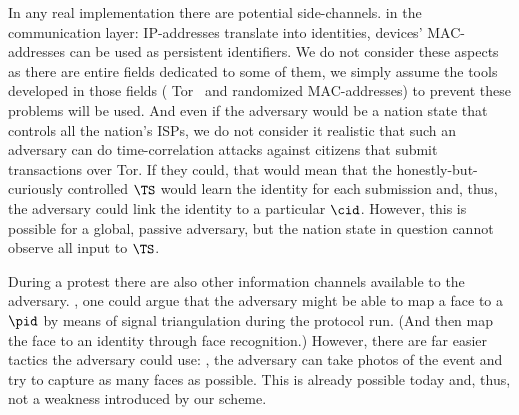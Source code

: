 In any real implementation there are potential side-channels.
\Eg in the communication layer: IP-addresses translate into identities, 
devices' MAC-addresses can be used as persistent identifiers.
We do not consider these aspects as there are entire fields dedicated to some 
of them, we simply assume the tools developed in those fields (\eg 
Tor~\cite{Tor} and randomized MAC-addresses) to prevent these problems will be 
used.
And even if the adversary would be a nation state that controls all the 
nation's \acp{ISP}, we do not consider it realistic that such an adversary can 
do \eg time-correlation attacks against citizens that submit transactions over 
Tor.
If they could, that would mean that the honestly-but-curiously controlled 
\(\TS\) would learn the identity for each submission and, thus, the adversary 
could link the identity to a particular \(\cid\).
However, this is possible for a global, passive adversary, but the nation state 
in question cannot observe all input to \(\TS\).

During a protest there are also other information channels available to the 
adversary.
\Eg, one could argue that the adversary might be able to map a face to a 
\(\pid\) by means of signal triangulation during the protocol run.
(And then map the face to an identity through face recognition.)
However, there are far easier tactics the adversary could use: \eg, the 
adversary can take photos of the event and try to capture as many faces as 
possible.
This is already possible today and, thus, not a weakness introduced by our 
scheme.

%
%
%

